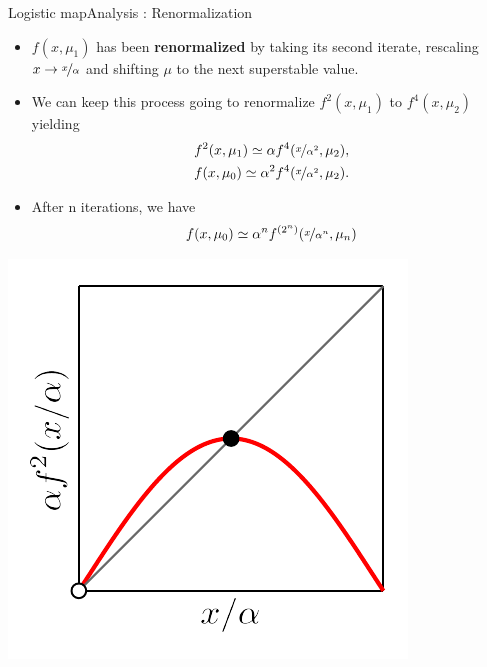 \documentclass[usenames,dvipsnames,svgnames,10pt,aspectratio=169]{beamer}
\begin{document}
\begin{frame}[t, c]{Logistic map}{Analysis : Renormalization}
	\begin{minipage}{.68\textwidth}
		\begin{itemize}
			\item \(f(x, \mu_1)\) has been \textbf{renormalized} by taking its second iterate, rescaling \(x \to \nicefrac{x}{\alpha}\) and shifting \( \mu \) to the next superstable value.

			\medskip

			\item We can keep this process going to renormalize \( f^2(x, \mu_1) \) to \( f^4(x, \mu_2) \) yielding
			\[
				\begin{aligned}
					& f^2(x, \mu_1) \simeq \alpha f^4(\nicefrac{x}{\alpha^2}, \mu_2), \\
					& f(x, \mu_0) \simeq \alpha^2 f^4(\nicefrac{x}{\alpha^2}, \mu_2).
				\end{aligned}
			\]

			\item After n iterations, we have
			\[
				f(x, \mu_0) \simeq \alpha^{n} f^{\left( 2^n \right)}(\nicefrac{x}{\alpha^n}, \mu_{n})
			\]
		\end{itemize}
	\end{minipage}%
	\hfill
	\begin{minipage}{.28\textwidth}
		\centering
		\includegraphics[width=\textwidth]{renormalization_3}
	\end{minipage}

	\vspace{1cm}
\end{frame}
\end{document}
